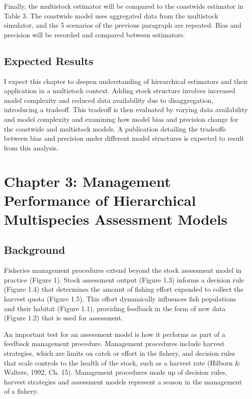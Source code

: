 \documentclass[12pt,]{scrartcl}
\begin{document}
Finally, the multistock estimator will be compared to the coastwide
estimator in Table 3. The coastwide model uses aggregated data from the
multistock simulator, and the 5 scenarios of the previous paragraph are
repeated. Bias and precision will be recorded and compared between
estimators.

\subsection{Expected Results}\label{expected-results-1}

I expect this chapter to deepen understanding of hierarchical estimators
and their application in a multistock context. Adding stock structure
involves increased model complexity and reduced data availability due to
disaggregation, introducing a tradeoff. This tradeoff is then evaluated
by varying data availability and model complexity and examining how
model bias and precision change for the coastwide and multistock models.
A publication detailing the tradeoffs between bias and precision under
different model structures is expected to result from this analysis.

\section{Chapter 3: Management Performance of Hierarchical Multispecies
Assessment
Models}\label{chapter-3-management-performance-of-hierarchical-multispecies-assessment-models}

\subsection{Background}\label{background-3}

Fisheries management procedures extend beyond the stock assessment model
in practice (Figure 1). Stock assessment output (Figure 1.3) informs a
decision rule (Figure 1.4) that determines the amount of fishing effort
expended to collect the harvest quota (Figure 1.5). This effort
dynamically influences fish populations and their habitat (Figure 1.1),
providing feedback in the form of new data (Figure 1.2) that is used for
assessment.

An important test for an assessment model is how it performs as part of
a feedback management procedure. Management procedures include harvest
strategies, which are limits on catch or effort in the fishery, and
decision rules that scale controls to the health of the stock, such as a
harvest rate (Hilborn \& Walters, 1992, Ch. 15). Management procedures
made up of decision rules, harvest strategies and assessment models
represent a season in the management of a fishery.
\end{document}
